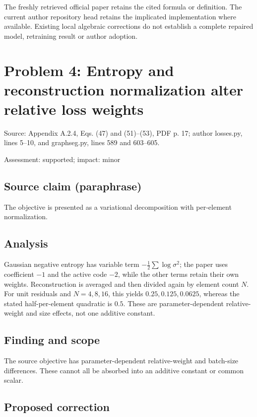 \documentclass[11pt]{article}
\begin{document}
The freshly retrieved official paper retains the cited formula or definition. The current author repository head retains the implicated implementation where available. Existing local algebraic corrections do not establish a complete repaired model, retraining result or author adoption.

\section*{Problem 4: Entropy and reconstruction normalization alter relative loss weights}

Source: Appendix A.2.4, Eqs. (47) and (51)–(53), PDF p. 17; author losses.py, lines 5–10, and graphseg.py, lines 589 and 603–605.

Assessment: supported; impact: minor

\subsection*{Source claim (paraphrase)}

The objective is presented as a variational decomposition with per-element normalization.

\subsection*{Analysis}

Gaussian negative entropy has variable term \(-\frac12\sum\log\sigma^2\); the paper uses coefficient \(-1\) and the active code \(-2\), while the other terms retain their own weights. Reconstruction is averaged and then divided again by element count \(N\). For unit residuals and \(N=4,8,16\), this yields \(0.25,0.125,0.0625\), whereas the stated half-per-element quadratic is \(0.5\). These are parameter-dependent relative-weight and size effects, not one additive constant.

\subsection*{Finding and scope}

The source objective has parameter-dependent relative-weight and batch-size differences. These cannot all be absorbed into an additive constant or common scalar.

\subsection*{Proposed correction}
\end{document}

